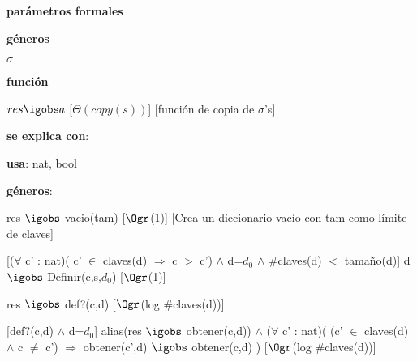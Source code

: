 \begin{Interfaz}
	
	\textbf{parámetros formales}\parindent\\
	\parbox{1.7cm}{\textbf{géneros}} $\sigma$\\
	\parbox[t]{1.7cm}{\textbf{función}}\parbox[t]{\textwidth-2\parindent-1.7cm}{%
	    	{$res \igobs a$}
		[$\Theta(copy(s))$]
		[función de copia de $\sigma$'s]
	}
	
	\textbf{se explica con}: 
	
	\textbf{usa}: nat, bool
	
	\textbf{géneros}: 
	
	
	{res $\igobs$ vacio(tam)}
	[$\Ogr$(1)]
	[Crea un diccionario vacío con tam como límite de claves]
	
	[($\forall$ c' : nat)( c' $\in$ claves(d) $\Rightarrow$ c $>$ c') $\land$ d=$d_0$ $\land$ $\#$claves(d) $<$ tamaño(d)]
	{d $\igobs$ Definir(c,s,$d_0$)}
	[$\Ogr$(1)]
	
	{res $\igobs$ def?(c,d)}
	[$\Ogr$(log $\#$claves(d))]
	
	[def?(c,d) $\land$ d=$d_0$]
	{alias(res $\igobs$ obtener(c,d)) $\land$ ($\forall$ c' : nat)( (c' $\in$ claves(d) $\land$ c $\neq$ c') 
	$\Rightarrow$ obtener(c',d) $\igobs$ obtener(c,d) )}
	[$\Ogr$(log $\#$claves(d))]
	
\end{Interfaz}

